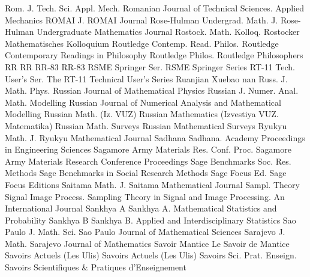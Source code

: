 {Rom. J. Tech. Sci. Appl. Mech.}
{Romanian Journal of Technical Sciences. Applied Mechanics}
{ROMAI J.}
{ROMAI Journal}
{Rose-Hulman Undergrad. Math. J.}
{Rose-Hulman Undergraduate Mathematics Journal}
{Rostock. Math. Kolloq.}
{Rostocker Mathematisches Kolloquium}
{Routledge Contemp. Read. Philos.}
{Routledge Contemporary Readings in Philosophy}
{Routledge Philos.}
{Routledge Philosophers}
{RR}
{RR}
{RR-83}
{RR-83}
{RSME Springer Ser.}
{RSME Springer Series}
{RT-11 Tech. User's Ser.}
{The RT-11 Technical User's Series}
{Ruanjian Xuebao}
{nan}
{Russ. J. Math. Phys.}
{Russian Journal of Mathematical Physics}
{Russian J. Numer. Anal. Math. Modelling}
{Russian Journal of Numerical Analysis and Mathematical Modelling}
{Russian Math. (Iz. VUZ)}
{Russian Mathematics (Izvestiya VUZ. Matematika)}
{Russian Math. Surveys}
{Russian Mathematical Surveys}
{Ryukyu Math. J.}
{Ryukyu Mathematical Journal}
{Sadhana}
{Sadhana. Academy Proceedings in Engineering Sciences}
{Sagamore Army Materials Res. Conf. Proc.}
{Sagamore Army Materials Research Conference Proceedings}
{Sage Benchmarks Soc. Res. Methods}
{Sage Benchmarks in Social Research Methods}
{Sage Focus Ed.}
{Sage Focus Editions}
{Saitama Math. J.}
{Saitama Mathematical Journal}
{Sampl. Theory Signal Image Process.}
{Sampling Theory in Signal and Image Processing. An International Journal}
{Sankhya A}
{Sankhya A. Mathematical Statistics and Probability}
{Sankhya B}
{Sankhya B. Applied and Interdisciplinary Statistics}
{Sao Paulo J. Math. Sci.}
{Sao Paulo Journal of Mathematical Sciences}
{Sarajevo J. Math.}
{Sarajevo Journal of Mathematics}
{Savoir Mantice}
{Le Savoir de Mantice}
{Savoirs Actuels (Les Ulis)}
{Savoirs Actuels (Les Ulis)}
{Savoirs Sci. Prat. Enseign.}
{Savoirs Scientifiques & Pratiques d'Enseignement}
